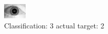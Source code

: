\begin{figure}[h!]
\begin{center}
\includegraphics[width=0.60\columnwidth]{figures/ID1697_class_3_target_2.png}
\end{center}
\caption{ Classification: 3 actual target: 2}
\label{fig:ID1697_class_3_target_2}
\end{figure}
